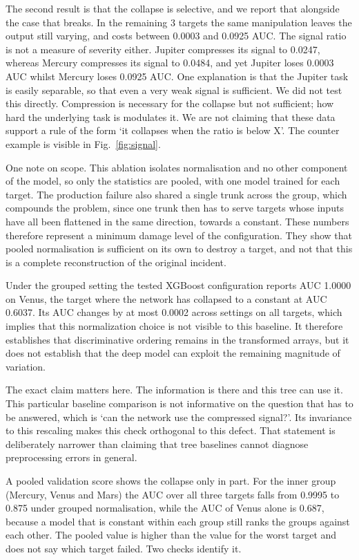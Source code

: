\documentclass[preprint,12pt,authoryear]{elsarticle}
\begin{document}
The second result is that the collapse is selective, and we report that alongside the case that breaks. In the remaining 3 targets the same manipulation leaves the output still varying, and costs between 0.0003 and 0.0925 AUC. The signal ratio is not a measure of severity either. Jupiter compresses its signal to 0.0247, whereas Mercury compresses its signal to 0.0484, and yet Jupiter loses 0.0003 AUC whilst Mercury loses 0.0925 AUC. One explanation is that the Jupiter task is easily separable, so that even a very weak signal is sufficient. We did not test this directly. Compression is necessary for the collapse but not sufficient; how hard the underlying task is modulates it. We are not claiming that these data support a rule of the form `it collapses when the ratio is below X'. The counter example is visible in Fig.~\ref{fig:signal}.

One note on scope. This ablation isolates normalisation and no other component of the model, so only the statistics are pooled, with one model trained for each target. The production failure also shared a single trunk across the group, which compounds the problem, since one trunk then has to serve targets whose inputs have all been flattened in the same direction, towards a constant. These numbers therefore represent a minimum damage level of the configuration. They show that pooled normalisation is sufficient on its own to destroy a target, and not that this is a complete reconstruction of the original incident.

Under the grouped setting the tested XGBoost configuration reports AUC 1.0000 on Venus, the target where the network has collapsed to a constant at AUC 0.6037. Its AUC changes by at most 0.0002 across settings on all targets, which implies that this normalization choice is not visible to this baseline. It therefore establishes that discriminative ordering remains in the transformed arrays, but it does not establish that the deep model can exploit the remaining magnitude of variation.

The exact claim matters here. The information is there and this tree can use it. This particular baseline comparison is not informative on the question that has to be answered, which is `can the network use the compressed signal?'. Its invariance to this rescaling makes this check orthogonal to this defect. That statement is deliberately narrower than claiming that tree baselines cannot diagnose preprocessing errors in general.

A pooled validation score shows the collapse only in part. For the inner group (Mercury, Venus and Mars) the AUC over all three targets falls from 0.9995 to 0.875 under grouped normalisation, while the AUC of Venus alone is 0.687, because a model that is constant within each group still ranks the groups against each other. The pooled value is higher than the value for the worst target and does not say which target failed. Two checks identify it.
\end{document}
